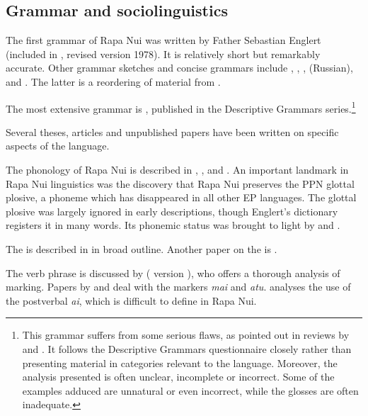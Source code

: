 \subsection{Grammar and sociolinguistics}\label{sec:1.5.2}

The first grammar of Rapa Nui was written by Father Sebastian Englert (included in \citealt{Englert1948}, revised version 1978). It is relatively short but remarkably accurate. Other grammar sketches and concise grammars include \citet{Fuentes1960}, \citet{Chapin1978}, \citet{Munro1978}, \citet{Fedorova1988} (Russian), \citet{ConteOliveros1996} and \citet{Rubino1998}. The latter is a reordering of material from \citet{DuFeu1996}.

The most extensive grammar is \citet{DuFeu1996}, published in the Descriptive Grammars series.\footnote{\label{fn:25}This grammar suffers from some serious flaws, as pointed out in reviews by \citet{Mosel1997} and \citet{WeberWeber1999}. It follows the Descriptive Grammars questionnaire closely rather than presenting material in categories relevant to the language. Moreover, the analysis presented is often unclear, incomplete or incorrect. Some of the examples adduced are unnatural or even incorrect, while the glosses are often inadequate.} 

Several theses, articles and unpublished papers have been written on specific aspects of the language. 

The phonology of Rapa Nui is described in \citet{DuFeu1985}, \citet{GuerraEissmann1993}, \citet{Salas1973} and \citet{WeberWeber1982}. An important landmark in Rapa Nui linguistics was the discovery that Rapa Nui preserves the PPN glottal plosive, a phoneme which has disappeared in all other EP languages. The glottal plosive was largely ignored in early descriptions, though Englert’s dictionary registers it in many words. Its phonemic status was brought to light by \citet{Ward1961,Ward1964} and \citet{Blixen1972}. 

The  is described in \citet{DuFeu1987} in broad outline. Another paper on the  is \citet{Gordon1977}.

The verb phrase is discussed by \citet{WeberR1988} ( version \citealt{WeberR2003}), who offers a thorough analysis of  marking. Papers by \citet{Fuller1980} and \citet{Wittenstein1978} deal with the  markers \textit{mai} and \textit{atu}. \citet{Chapin1974} analyses the use of the postverbal  \textit{ai}, which is difficult to define in Rapa Nui. 

